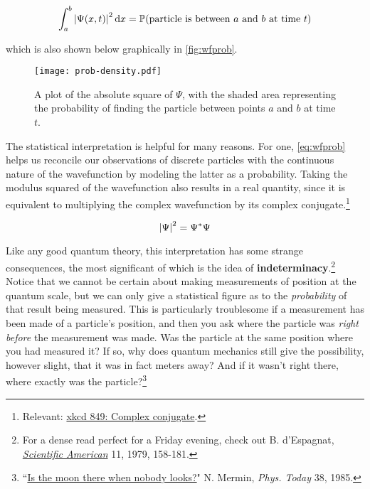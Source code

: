 \begin{tcolorbox}[title=Born's statistical interpretation of $\Psi$] \vspace{-2ex}
	\begin{equation}
		\int_a^b \abs{\Psi(x,t)}^2 \dd{x} = \mathbb{P}\text{(particle is between $a$ and $b$ at time $t$)} \label{eq:wfprob}
	\end{equation}
\end{tcolorbox}

\noindent which is also shown below graphically in \autoref{fig:wfprob}.

\begin{figure}[!h]
	\centering
	\texttt{[image: prob-density.pdf]}
	\caption{A plot of the absolute square of $\Psi$, with the shaded area representing the probability of finding the particle between points $a$ and $b$ at time $t$.}
	\label{fig:wfprob}
\end{figure}

The statistical interpretation is helpful for many reasons. 
For one, \autoref{eq:wfprob} helps us reconcile our observations of discrete particles with the continuous nature of the wavefunction by modeling the latter as a probability. 
Taking the modulus squared of the wavefunction also results in a real quantity, since it is equivalent to multiplying the complex wavefunction by its complex conjugate.\footnote{Relevant: \href{https://xkcd.com/849/}{xkcd 849: Complex conjugate}.}

\begin{tcolorbox}[title=Modulus squared of a complex number] \vspace{-2ex}
	\begin{equation}
		\abs{\Psi}^2 = \Psi^*\Psi
	\end{equation}
\end{tcolorbox}

Like any good quantum theory, this interpretation has some strange consequences, the most significant of which is the idea of \textbf{indeterminacy}.\footnote{For a dense read perfect for a Friday evening, check out B. d'Espagnat, \href{https://drive.google.com/file/d/1guIxArt4_G_G9hkvI5QCiWPoJC79YBmm/view?usp=sharing}{\emph{Scientific American}} 11, 1979, 158-181.} 
Notice that we cannot be certain about making measurements of position at the quantum scale, but we can only give a statistical figure as to the \emph{probability} of that result being measured. 
This is particularly troublesome if a measurement has been made of a particle's position, and then you ask where the particle was \emph{right before} the measurement was made. 
Was the particle at the same position where you had measured it? 
If so, why does quantum mechanics still give the possibility, however slight, that it was in fact meters away? 
And if it wasn't right there, where exactly was the particle?\footnote{``\href{http://physicstoday.scitation.org/doi/abs/10.1063/1.880968}{Is the moon there when nobody looks?}" N. Mermin, \emph{Phys. Today} 38, 1985.}


